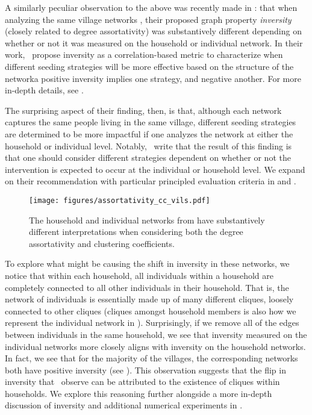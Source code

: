 A similarly peculiar observation to the above was recently made in \cite{kumar2024friendship}: that when analyzing the same village networks \citep{banerjee2013}, their proposed graph property \textit{inversity} (closely related to degree assortativity) was substantively different depending on whether or not it was measured on the household or individual network. In their work, \citeauthor{kumar2024friendship}~propose inversity as a correlation-based metric to characterize when different seeding strategies will be more effective based on the structure of the network\textemdash a positive inversity implies one strategy, and negative another. For more in-depth details, see \cite{kumar2024friendship}.

The surprising aspect of their finding, then, is that, although each network captures the same people living in the same village, different seeding strategies are determined to be more impactful if one analyzes the network at either the household or individual level. Notably, \citeauthor{kumar2024friendship}~write that the result of this finding is that one should consider different strategies dependent on whether or not the intervention is expected to occur at the individual or household level. We expand on their recommendation with particular principled evaluation criteria in  and .

\begin{figure}
    \centering
    \texttt{[image: figures/assortativity\_cc\_vils.pdf]}
    \caption{The household and individual networks from \cite{banerjee2013} have substantively different interpretations when considering both the degree assortativity and clustering coefficients.}
    \label{fig:deg_clus}
\end{figure}

To explore what might be causing the shift in inversity in these networks, we notice that within each household, all individuals within a household are completely connected to all other individuals in their household. That is, the network of individuals is essentially made up of many different cliques, loosely connected to other cliques (cliques amongst household members is also how we represent the individual network in ). Surprisingly, if we remove all of the edges between individuals in the same household, we see that inversity measured on the individual networks more closely aligns with inversity on the household networks. In fact, we see that for the majority of the villages, the corresponding networks both have positive inversity (see ). This observation suggests that the flip in inversity that \citeauthor{kumar2024friendship}~observe can be attributed to the existence of cliques within households. We explore this reasoning further alongside a more in-depth discussion of inversity and additional numerical experiments in .


